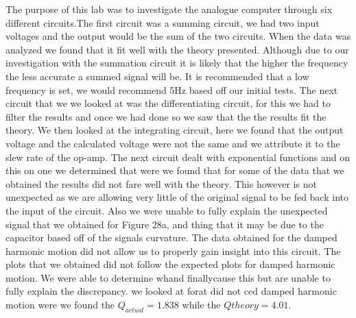 The purpose of this lab was to investigate the analogue computer through six different circuits.The first circuit was a summing circuit, we had two input voltages and the output would be the sum of the two circuits. When the data was analyzed we found that it fit well with the theory presented. Although due to our investigation with the summation circuit it is likely that the higher the frequency the less accurate a summed signal will be. It is recommended that a low frequency is set, we would recommend 5Hz based off our initial tests. The next circuit that we we looked at was the differentiating circuit, for this we had to filter the results and once we had done so we saw that the the results fit the theory. We then looked at the integrating circuit, here we found that the output voltage and the calculated voltage were not the same and we attribute it to the slew rate of the op-amp. The next circuit dealt with exponential functions and on this on one we determined that were we found that for some of the data that we obtained the results did not fare well with the theory. This however is not unexpected as we are allowing very little of the original signal to be fed back into the input of the circuit. Also we were unable to fully explain the unexpected signal that we obtained for Figure 28a, and thing that it may be due to the capacitor based off of the signals curvature. The data obtained for the damped harmonic motion did not allow us to properly gain insight into this circuit. The plots that we obtained did not follow the expected plots for damped harmonic motion. We were able to determine whand finallycause this but are unable to fully explain the discrepancy.   we looked at forat did not ced damped harmonic motion were we found the $Q_{actual} = 1.838$ while the $Q{theory} = 4.01$.